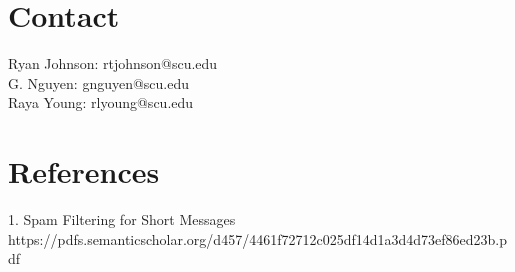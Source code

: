 \documentclass[12pt]{article} %
\newcommand\tab[1][1cm]{\hspace*{#1}}
\begin{document}

\section*{Contact}
Ryan Johnson: rtjohnson@scu.edu\\
G. Nguyen: gnguyen@scu.edu\\
Raya Young: rlyoung@scu.edu




\section*{References}

1. Spam Filtering for Short Messages \newline
\tab https://pdfs.semanticscholar.org/d457/4461f72712c025df14d1a3d4d73ef86ed23b.pdf


\end{document}
